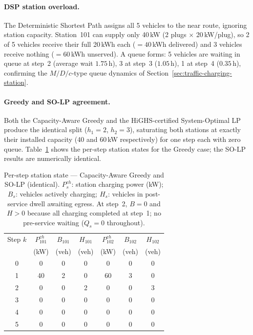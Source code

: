 \paragraph{DSP station overload.}
The Deterministic Shortest Path assigns all 5 vehicles to the near route,
ignoring station capacity.  Station~101 can supply only 40\,kW (2 plugs
$\times$ 20\,kW/plug), so 2 of 5 vehicles receive their full 20\,kWh each
($= 40$\,kWh delivered) and 3 vehicles receive nothing
($= 60$\,kWh unserved).
A queue forms: 5 vehicles are waiting in queue at step~2 (average wait
$1.75\,\text{h}$), 3 at step~3 ($1.05\,\text{h}$), 1 at step~4
($0.35\,\text{h}$), confirming the $M/D/c$-type queue dynamics of
Section~\ref{sec:traffic-charging-station}.

\paragraph{Greedy and SO-LP agreement.}
Both the Capacity-Aware Greedy and the HiGHS-certified System-Optimal LP
produce the identical split ($h_1 = 2$, $h_2 = 3$), saturating both
stations at exactly their installed capacity (40 and 60\,kW respectively)
for one step each with zero queue.
Table~\ref{tab:nr-station-step} shows the per-step station states for the
Greedy case; the SO-LP results are numerically identical.

\begin{table}[htbp]
\centering
\caption{Per-step station state --- Capacity-Aware Greedy and SO-LP (identical).
  $P^{ch}_s$: station charging power (kW);
  $B_s$: vehicles actively charging;
  $H_s$: vehicles in post-service dwell awaiting egress.
  At step~2, $B=0$ and $H>0$ because all charging completed at step~1;
  no pre-service waiting ($Q_s = 0$ throughout).}
\label{tab:nr-station-step}
\begin{tabular}{ccccccc}
\toprule
Step $k$ & $P^{ch}_{101}$ & $B_{101}$ & $H_{101}$ &
           $P^{ch}_{102}$ & $B_{102}$ & $H_{102}$ \\
 & (kW) & (veh) & (veh) & (kW) & (veh) & (veh) \\
\midrule
0 &  0 & 0 & 0 &  0 & 0 & 0 \\
1 & 40 & 2 & 0 & 60 & 3 & 0 \\
2 &  0 & 0 & 2 &  0 & 0 & 3 \\
3 &  0 & 0 & 0 &  0 & 0 & 0 \\
4 &  0 & 0 & 0 &  0 & 0 & 0 \\
5 &  0 & 0 & 0 &  0 & 0 & 0 \\
\bottomrule
\end{tabular}
\end{table}

